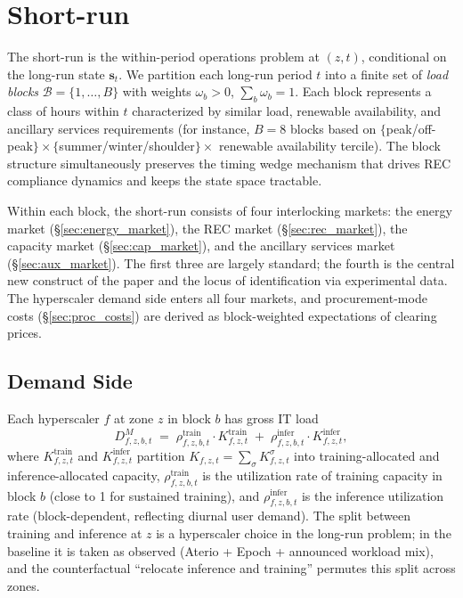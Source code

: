\documentclass[12pt,letterpaper]{article}
\begin{document}
\section{Short-run}
\label{sec:shortrun}

The short-run is the within-period operations problem at $(z, t)$, conditional
on the long-run state $\mathbf{s}_t$. We partition each long-run period $t$
into a finite set of \emph{load blocks} $\mathcal{B} = \{1, \dots, B\}$ with
weights $\omega_b > 0$, $\sum_b \omega_b = 1$. Each block represents a class
of hours within $t$ characterized by similar load, renewable availability,
and ancillary services requirements (for instance, $B = 8$ blocks based on
$\{$peak/off-peak$\} \times \{$summer/winter/shoulder$\} \times $ renewable
availability tercile). The block structure simultaneously preserves the
timing wedge mechanism that drives REC compliance dynamics and keeps the
state space tractable.

Within each block, the short-run consists of four interlocking markets:
the energy market (\S\ref{sec:energy_market}), the REC market
(\S\ref{sec:rec_market}), the capacity market (\S\ref{sec:cap_market}),
and the ancillary services market (\S\ref{sec:aux_market}). The first
three are largely standard; the fourth is the central new construct of
the paper and the locus of identification via experimental data. The
hyperscaler demand side enters all four markets, and procurement-mode
costs (\S\ref{sec:proc_costs}) are derived as block-weighted expectations
of clearing prices.

\subsection{Demand Side}
\label{sec:demand}

Each hyperscaler $f$ at zone $z$ in block $b$ has gross IT load
\begin{equation}
\label{eq:gross_load}
D^M_{f,z,b,t} \;=\; \rho^{\text{train}}_{f,z,b,t} \cdot K^{\text{train}}_{f,z,t}
\;+\; \rho^{\text{infer}}_{f,z,b,t} \cdot K^{\text{infer}}_{f,z,t},
\end{equation}
where $K^{\text{train}}_{f,z,t}$ and $K^{\text{infer}}_{f,z,t}$ partition
$K_{f,z,t} = \sum_\sigma K_{f,z,t}^\sigma$ into training-allocated and
inference-allocated capacity, $\rho^{\text{train}}_{f,z,b,t}$ is the
utilization rate of training capacity in block $b$ (close to 1 for sustained
training), and $\rho^{\text{infer}}_{f,z,b,t}$ is the inference utilization
rate (block-dependent, reflecting diurnal user demand). The split between
training and inference at $z$ is a hyperscaler choice in the long-run problem;
in the baseline it is taken as observed (Aterio + Epoch + announced workload
mix), and the counterfactual ``relocate inference and training'' permutes
this split across zones.
\end{document}
